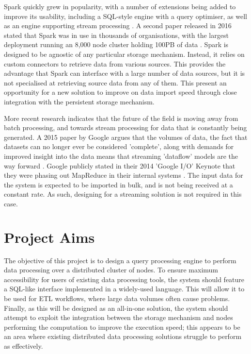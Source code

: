 Spark quickly grew in popularity, with a number of extensions being added to improve its usability, including a SQL-style engine with a query optimiser, as well as an engine supporting stream processing \cite{armbrust2015sparksql, armbrust2018sparkstreaming}. A second paper released in 2016 stated that Spark was in use in thousands of organisations, with the largest deployment running an 8,000 node cluster holding 100PB of data \cite{zaharia2016spark}. Spark is designed to be agnostic of any particular storage mechanism. Instead, it relies on custom connectors to retrieve data from various sources. This provides the advantage that Spark can interface with a large number of data sources, but it is not specialised at retrieving source data from any of them. This present an opportunity for a new solution to improve on data import speed through close integration with the persistent storage mechanism.

More recent research indicates that the future of the field is moving away from batch processing, and towards stream processing for data that is constantly being generated. A 2015 paper by Google argues that the volumes of data, the fact that datasets can no longer ever be considered 'complete', along with demands for improved insight into the data means that streaming 'dataflow' models are the way forward  \cite{akidau2015dataflow}. Google publicly stated in their 2014 'Google I/O' Keynote that they were phasing out MapReduce in their internal systems \cite{googleio2014}. The input data for the system is expected to be imported in bulk, and is not being received at a constant rate. As such, designing for a streaming solution is not required in this case.

\section{Project Aims}
The objective of this project is to design a query processing engine to perform data processing over a distributed cluster of nodes. To ensure maximum accessibility for users of existing data processing tools, the system should feature a SQL-like interface implemented in a widely-used language. This will allow it to be used for ETL workflows, where large data volumes often cause problems. Finally, as this will be designed as an all-in-one solution, the system should attempt to exploit the integration between the storage mechanism and nodes performing the computation to improve the execution speed; this appears to be an area where existing distributed data processing solutions struggle to perform as effectively.


